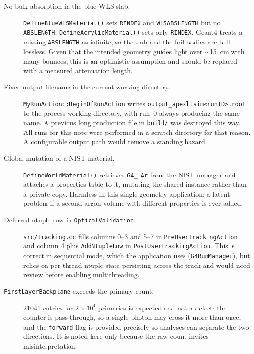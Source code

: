 \documentclass[a4paper,11pt]{article}
\begin{document}
\begin{description}
\item[No bulk absorption in the blue-WLS slab.]
\texttt{DefineBlueWLSMaterial()} sets \texttt{RINDEX} and \texttt{WLSABSLENGTH}
but no \texttt{ABSLENGTH}; \texttt{DefineAcrylicMaterial()} sets only
\texttt{RINDEX}. Geant4 treats a missing \texttt{ABSLENGTH} as infinite, so the
slab and the foil bodies are bulk-lossless. Given that the intended geometry
guides light over $\sim$\SI{15}{\centi\meter} with many bounces, this is an
optimistic assumption and should be replaced with a measured attenuation length.

\item[Fixed output filename in the current working directory.]
\texttt{MyRunAction::BeginOfRunAction} writes
\texttt{output\_apexltsim<runID>.root} to the process working directory, with
run~0 always producing the same name. A previous long production file in
\texttt{build/} was destroyed this way. All runs for this note were performed in
a scratch directory for that reason. A configurable output path would remove a
standing hazard.

\item[Global mutation of a NIST material.] \texttt{DefineWorldMaterial()}
retrieves \texttt{G4\_lAr} from the NIST manager and attaches a properties table
to it, mutating the shared instance rather than a private copy. Harmless in this
single-geometry application; a latent problem if a second argon volume with
different properties is ever added.

\item[Deferred ntuple row in \texttt{OpticalValidation}.]
\texttt{src/tracking.cc} fills columns 0--3 and 5--7 in
\texttt{PreUserTrackingAction} and column 4 plus \texttt{AddNtupleRow} in
\texttt{PostUserTrackingAction}. This is correct in sequential mode, which the
application uses (\texttt{G4RunManager}), but relies on per-thread ntuple state
persisting across the track and would need review before enabling
multithreading.

\item[\texttt{FirstLayerBackplane} exceeds the primary count.] 21041 entries for
$2\times10^{4}$ primaries is expected and not a defect: the counter is
pass-through, so a single photon may cross it more than once, and the
\texttt{forward} flag is provided precisely so analyses can separate the two
directions. It is noted here only because the raw count invites
misinterpretation.
\end{description}
\end{document}

